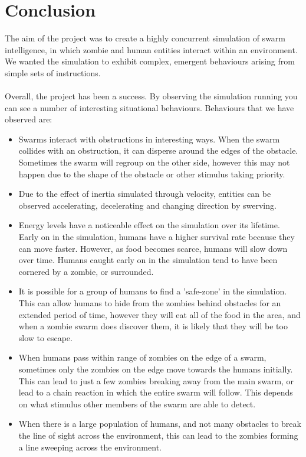 \documentclass[10pt, a4paper, conference, compsocconf]{IEEEtran}
\begin{document}
\section{Conclusion}
The aim of the project was to create a highly concurrent simulation of swarm intelligence, in which zombie and human entities interact within an environment. We wanted the simulation to exhibit complex, emergent behaviours arising from simple sets of instructions.\\
\\
Overall, the project has been a success. By observing the simulation running you can see a number of interesting situational behaviours. Behaviours that we have observed are:
\begin{itemize}
    \item Swarms interact with obstructions in interesting ways. When the swarm collides with an obstruction, it can disperse around the edges of the obstacle. Sometimes the swarm will regroup on the other side, however this may not happen due to the shape of the obstacle or other stimulus taking priority.
    \item Due to the effect of inertia simulated through velocity, entities can be observed accelerating, decelerating and changing direction by swerving. \item Energy levels have a noticeable effect on the simulation over its lifetime. Early on in the simulation, humans have a higher survival rate because they can move faster. However, as food becomes scarce, humans will slow down over time. Humans caught early on in the simulation tend to have been cornered by a zombie, or surrounded.
    \item It is possible for a group of humans to find a 'safe-zone' in the simulation. This can allow humans to hide from the zombies behind obstacles  for an extended period of time, however they will eat all of the food in the area, and when a zombie swarm does discover them, it is likely that they will be too slow to escape.
    \item When humans pass within range of zombies on the edge of a swarm, sometimes only the zombies on the edge move towards the humans initially. This can lead to just a few zombies breaking away from the main swarm, or lead to a chain reaction in which the entire swarm will follow. This depends on what stimulus other members of the swarm are able to detect.
    \item When there is a large population of humans, and not many obstacles to break the line of sight across the environment, this can lead to the zombies forming a line sweeping across the environment.
\end{itemize}
\end{document}
